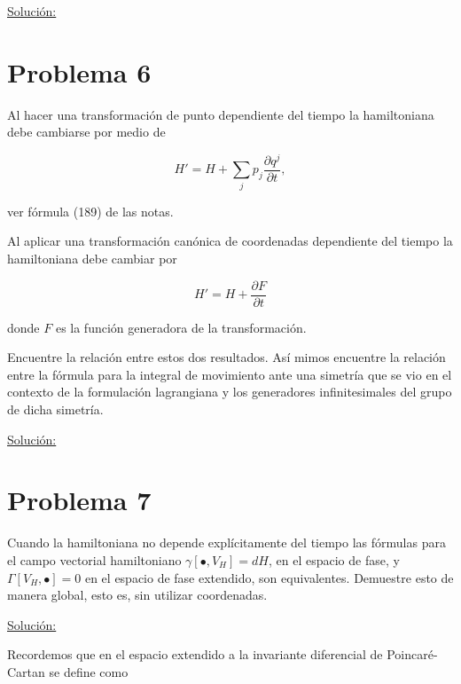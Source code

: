 \documentclass[a4paper,10pt]{article}
\numberwithin{equation}{section}
\begin{document}
\vspace{.3cm}

\underline{Solución:} \vspace{.3cm}

\section{Problema 6}

Al hacer una transformación de punto dependiente del tiempo la hamiltoniana 
debe cambiarse por medio de 

$$
H' = H + \sum_j p_j \frac{\partial q^j}{\partial t},
$$

ver fórmula (189) de las notas.

\vspace{.3cm}

Al aplicar una transformación canónica de coordenadas dependiente del tiempo la 
hamiltoniana debe cambiar por 

$$
H' = H + \frac{\partial F}{\partial t}
$$

donde $F$ es la función generadora de la transformación. 

\vspace{.3cm}

Encuentre la relación entre estos dos resultados. Así mimos encuentre la relación 
entre la fórmula para la integral de movimiento ante una simetría que se vio en el 
contexto de la formulación lagrangiana y los generadores infinitesimales del grupo 
de dicha simetría.

\vspace{.3cm}

\underline{Solución:} \vspace{.3cm}

\section{Problema 7}

Cuando la hamiltoniana no depende explícitamente del tiempo las fórmulas para el 
campo vectorial hamiltoniano $\gamma[\bullet,V_H] = dH$, en el espacio de fase, 
y $\Gamma[V_H,\bullet] = 0$ en el espacio de fase extendido, son equivalentes. 
Demuestre esto de manera global, esto es, sin utilizar coordenadas.

\vspace{.3cm}

\underline{Solución:} \vspace{.3cm}

Recordemos que en el espacio extendido a la invariante diferencial de Poincaré-Cartan 
se define como
\end{document}
